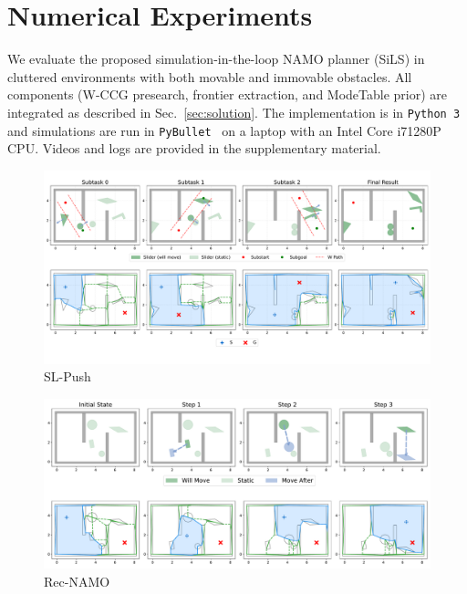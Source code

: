 \section{Numerical Experiments}
\label{sec:experiments}
We evaluate the proposed simulation-in-the-loop NAMO planner (SiLS)
in cluttered environments with both movable and immovable obstacles.
All components (W-CCG presearch, frontier extraction, and ModeTable prior)
are integrated as described in Sec.~\ref{sec:solution}.
The implementation is in \texttt{Python~3} and simulations are run in
\texttt{PyBullet}~\cite{coumans2019} on a laptop with an Intel
Core i7\textendash1280P CPU. Videos and logs are provided in the
supplementary material.
\begin{figure}
  \centering
  \includegraphics[width=\columnwidth]{figures/straight.pdf}

\caption{SL-Push}
\end{figure}

\begin{figure}
  \centering
  \includegraphics[width=\columnwidth]{figures/Recursive.pdf}
\caption{Rec-NAMO}
\end{figure}



